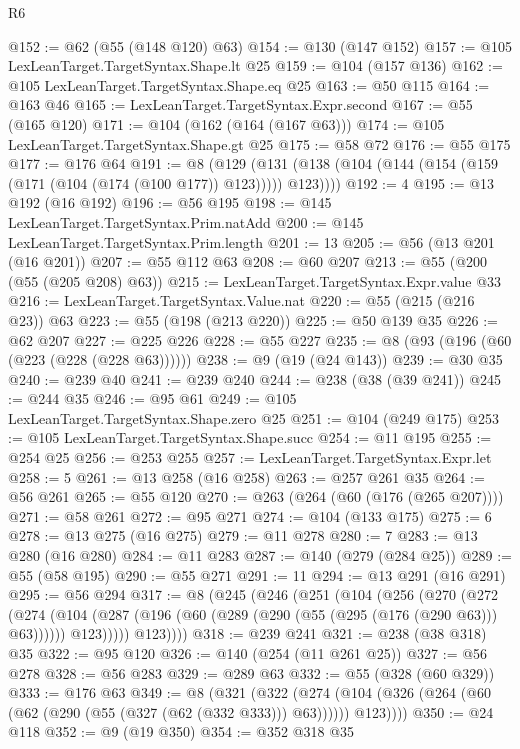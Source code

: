 \begin{lexlean}{R6}
\begin{coremodule}
{{{{{{{{{{{{{{{{{{{{@152 := @62 (@55 (@148 @120) @63)
@154 := @130 (@147 @152)
@157 := @105 LexLeanTarget.TargetSyntax.Shape.lt @25
@159 := @104 (@157 @136)
@162 := @105 LexLeanTarget.TargetSyntax.Shape.eq @25
@163 := @50 @115
@164 := @163 @46
@165 := LexLeanTarget.TargetSyntax.Expr.second
@167 := @55 (@165 @120)
@171 := @104 (@162 (@164 (@167 @63)))
@174 := @105 LexLeanTarget.TargetSyntax.Shape.gt @25
@175 := @58 @72
@176 := @55 @175
@177 := @176 @64
@191 := @8
    (@129 (@131 (@138 (@104 (@144 (@154 (@159 (@171 (@104 (@174 (@100 @177)) @123))))) @123))))
@192 := 4
@195 := @13 @192 (@16 @192)
@196 := @56 @195
@198 := @145 LexLeanTarget.TargetSyntax.Prim.natAdd
@200 := @145 LexLeanTarget.TargetSyntax.Prim.length
@201 := 13
@205 := @56 (@13 @201 (@16 @201))
@207 := @55 @112 @63
@208 := @60 @207
@213 := @55 (@200 (@55 (@205 @208) @63))
@215 := LexLeanTarget.TargetSyntax.Expr.value @33
@216 := LexLeanTarget.TargetSyntax.Value.nat
@220 := @55 (@215 (@216 @23)) @63
@223 := @55 (@198 (@213 @220))
@225 := @50 @139 @35
@226 := @62 @207
@227 := @225 @226
@228 := @55 @227
@235 := @8 (@93 (@196 (@60 (@223 (@228 (@228 @63))))))
@238 := @9 (@19 (@24 @143))
@239 := @30 @35
@240 := @239 @40
@241 := @239 @240
@244 := @238 (@38 (@39 @241))
@245 := @244 @35
@246 := @95 @61
@249 := @105 LexLeanTarget.TargetSyntax.Shape.zero @25
@251 := @104 (@249 @175)
@253 := @105 LexLeanTarget.TargetSyntax.Shape.succ
@254 := @11 @195
@255 := @254 @25
@256 := @253 @255
@257 := LexLeanTarget.TargetSyntax.Expr.let
@258 := 5
@261 := @13 @258 (@16 @258)
@263 := @257 @261 @35
@264 := @56 @261
@265 := @55 @120
@270 := @263 (@264 (@60 (@176 (@265 @207))))
@271 := @58 @261
@272 := @95 @271
@274 := @104 (@133 @175)
@275 := 6
@278 := @13 @275 (@16 @275)
@279 := @11 @278
@280 := 7
@283 := @13 @280 (@16 @280)
@284 := @11 @283
@287 := @140 (@279 (@284 @25))
@289 := @55 (@58 @195)
@290 := @55 @271
@291 := 11
@294 := @13 @291 (@16 @291)
@295 := @56 @294
@317 := @8
    (@245
      (@246
        (@251
          (@104
            (@256
              (@270
                (@272
                  (@274
                    (@104
                      (@287 (@196 (@60 (@289 (@290 (@55 (@295 (@176 (@290 @63))) @63))))))
                      @123)))))
            @123))))
@318 := @239 @241
@321 := @238 (@38 @318) @35
@322 := @95 @120
@326 := @140 (@254 (@11 @261 @25))
@327 := @56 @278
@328 := @56 @283
@329 := @289 @63
@332 := @55 (@328 (@60 @329))
@333 := @176 @63
@349 := @8
    (@321
      (@322 (@274 (@104 (@326 (@264 (@60 (@62 (@290 (@55 (@327 (@62 (@332 @333))) @63)))))) @123))))
@350 := @24 @118
@352 := @9 (@19 @350)
@354 := @352 @318 @35
}}}}}}}}}}}}}}}}}}}}
\end{coremodule}
\end{lexlean}
